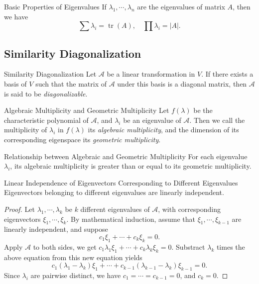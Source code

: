 \begin{proposition}{Basic Properties of Eigenvalues}{}
  If $\lambda_1,\cdots,\lambda_n$ are the eigenvalues of matrix $A$,
  then we have
  \begin{equation}
    \sum \lambda_i = \operatorname{tr}(A),\quad
    \prod \lambda_i = |A|.
  \end{equation}
\end{proposition}

\subsection{Similarity Diagonalization}

\begin{definition}{Similarity Diagonalization}{}
  Let $\mathcal{A}$ be a linear transformation in $V$.
  If there exists a basis of $V$ such that the matrix of $\mathcal{A}$
  under this basis is a diagonal matrix,
  then $\mathcal{A}$ is said to be \emph{diagonalizable}.
\end{definition}

\begin{definition}{Algebraic Multiplicity and Geometric Multiplicity}{}
  Let $f(\lambda)$ be the characteristic polynomial of $\mathcal{A}$,
  and $\lambda_i$ be an eigenvalue of $\mathcal{A}$.
  Then we call the multiplicity of $\lambda_i$ in $f(\lambda)$ its
  \emph{algebraic multiplicity},
  and the dimension of its corresponding eigenspace its \emph{geometric multiplicity}.
\end{definition}

\begin{lemma}{Relationship between Algebraic and Geometric Multiplicity}{}
  For each eigenvalue $\lambda_i$,
  its algebraic multiplicity is greater than or equal to its geometric multiplicity.
\end{lemma}

\begin{proposition}{Linear Independence of Eigenvectors Corresponding to
    Different Eigenvalues}{}
  Eigenvectors belonging to different eigenvalues are linearly independent.
\end{proposition}

\begin{proof}
  Let $\lambda_1,\cdots,\lambda_k$ be $k$ different eigenvalues of
  $\mathcal{A}$,
  with corresponding eigenvectors $\xi_1,\cdots,\xi_k$.
  By mathematical induction, assume that $\xi_1,\cdots,\xi_{k-1}$ are linearly
  independent,
  and suppose
  \begin{equation}
    c_1\xi_1 + \cdots + c_k\xi_k = 0.
  \end{equation}
  Apply $\mathcal{A}$ to both sides, we get $c_1\lambda_1\xi_1 + \cdots +
  c_k\lambda_k\xi_k = 0$.
  Substract $\lambda_k$ times the above equation from this new equation yields
  \begin{equation}
    c_1(\lambda_1 - \lambda_k)\xi_1 + \cdots + c_{k-1}(\lambda_{k-1} - \lambda_k)\xi_{k-1} = 0.
  \end{equation}
  Since $\lambda_i$ are pairwise distinct,
  we have $c_1 = \cdots = c_{k-1} = 0$,
  and $c_k = 0$.
\end{proof}


